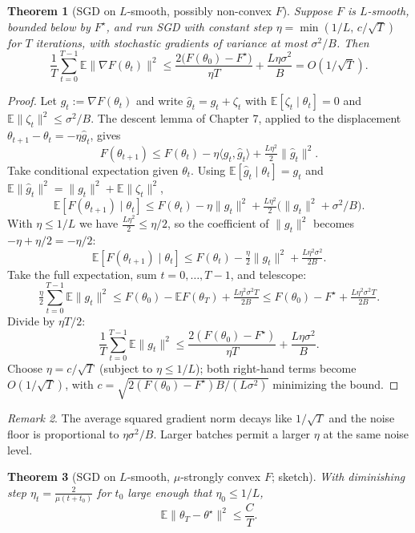 \documentclass[11pt]{article}
\newtheorem{theorem}{Theorem}[section]
\theoremstyle{remark}
\newtheorem{remark}[theorem]{Remark}
\begin{document}
\begin{theorem}[SGD on $L$-smooth, possibly non-convex $F$]
Suppose $F$ is $L$-smooth, bounded below by $F^\star$, and run SGD with constant step $\eta = \min(1/L,\, c/\sqrt{T})$ for $T$ iterations, with stochastic gradients of variance at most $\sigma^2/B$. Then
\[
\frac{1}{T}\sum_{t=0}^{T-1} \mathbb{E}\|\nabla F(\theta_t)\|^2 \leq \frac{2\big(F(\theta_0) - F^\star\big)}{\eta T} + \frac{L \eta \sigma^2}{B} = O(1/\sqrt{T}).
\]
\end{theorem}

\begin{proof}
Let $g_t := \nabla F(\theta_t)$ and write $\hat g_t = g_t + \zeta_t$ with $\mathbb{E}[\zeta_t \mid \theta_t] = 0$ and $\mathbb{E}\|\zeta_t\|^2 \leq \sigma^2/B$. The descent lemma of Chapter 7, applied to the displacement $\theta_{t+1} - \theta_t = -\eta \hat g_t$, gives
\[
F(\theta_{t+1}) \leq F(\theta_t) - \eta \langle g_t, \hat g_t\rangle + \tfrac{L \eta^2}{2}\|\hat g_t\|^2.
\]
Take conditional expectation given $\theta_t$. Using $\mathbb{E}[\hat g_t \mid \theta_t] = g_t$ and $\mathbb{E}\|\hat g_t\|^2 = \|g_t\|^2 + \mathbb{E}\|\zeta_t\|^2$,
\[
\mathbb{E}[F(\theta_{t+1}) \mid \theta_t] \leq F(\theta_t) - \eta\|g_t\|^2 + \tfrac{L\eta^2}{2}\big(\|g_t\|^2 + \sigma^2/B\big).
\]
With $\eta \leq 1/L$ we have $\tfrac{L\eta^2}{2} \leq \eta/2$, so the coefficient of $\|g_t\|^2$ becomes $-\eta + \eta/2 = -\eta/2$:
\[
\mathbb{E}[F(\theta_{t+1}) \mid \theta_t] \leq F(\theta_t) - \tfrac{\eta}{2}\|g_t\|^2 + \tfrac{L \eta^2 \sigma^2}{2B}.
\]
Take the full expectation, sum $t = 0, \dots, T-1$, and telescope:
\[
\tfrac{\eta}{2} \sum_{t=0}^{T-1} \mathbb{E}\|g_t\|^2 \leq F(\theta_0) - \mathbb{E} F(\theta_T) + \tfrac{L \eta^2 \sigma^2 T}{2B} \leq F(\theta_0) - F^\star + \tfrac{L \eta^2 \sigma^2 T}{2B}.
\]
Divide by $\eta T / 2$:
\[
\frac{1}{T}\sum_{t=0}^{T-1}\mathbb{E}\|g_t\|^2 \leq \frac{2(F(\theta_0) - F^\star)}{\eta T} + \frac{L \eta \sigma^2}{B}.
\]
Choose $\eta = c/\sqrt{T}$ (subject to $\eta \leq 1/L$); both right-hand terms become $O(1/\sqrt{T})$, with $c = \sqrt{2(F(\theta_0) - F^\star) B / (L \sigma^2)}$ minimizing the bound.
\end{proof}

\begin{remark}
The average squared gradient norm decays like $1/\sqrt{T}$ and the noise floor is proportional to $\eta \sigma^2 / B$. Larger batches permit a larger $\eta$ at the same noise level.
\end{remark}

\begin{theorem}[SGD on $L$-smooth, $\mu$-strongly convex $F$; sketch]
With diminishing step $\eta_t = \tfrac{2}{\mu(t + t_0)}$ for $t_0$ large enough that $\eta_0 \leq 1/L$,
\[
\mathbb{E}\|\theta_T - \theta^\star\|^2 \leq \frac{C}{T}.
\]
\end{theorem}
\end{document}
